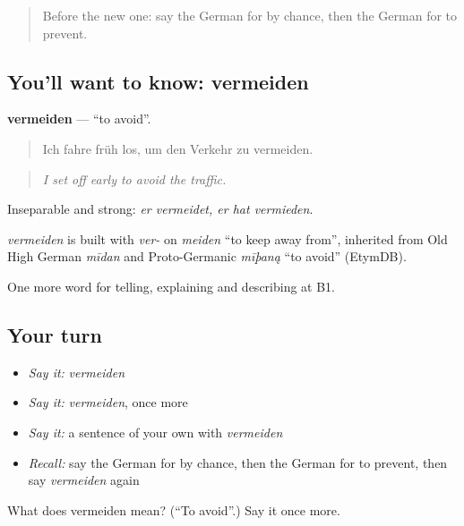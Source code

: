 \begin{quote}
Before the new one: say the German for by chance, then the German for to prevent.
\end{quote}

\subsection*{You'll want to know: vermeiden}
\textbf{vermeiden} — \textquotedblleft{}to avoid\textquotedblright{}.

\begin{quote}
Ich fahre früh los, um den Verkehr zu vermeiden.
\end{quote}

\begin{quote}
\emph{I set off early to avoid the traffic.}
\end{quote}

Inseparable and strong: \emph{er vermeidet, er hat vermieden}.

\begin{cousinweb}
\emph{vermeiden} is built with \emph{ver-} on \emph{meiden} \textquotedblleft{}to keep away from\textquotedblright{}, inherited from Old High German \emph{mīdan} and Proto-Germanic \emph{mīþaną} \textquotedblleft{}to avoid\textquotedblright{} (EtymDB).
\end{cousinweb}

\begin{grammarlens}[title={What you've built}]
One more word for telling, explaining and describing at B1.
\end{grammarlens}

\subsection*{Your turn}
\begin{itemize}
\raggedright
  \item \emph{Say it:} \emph{vermeiden}
  \item \emph{Say it:} \emph{vermeiden}, once more
  \item \emph{Say it:} a sentence of your own with \emph{vermeiden}
  \item \emph{Recall:} say the German for by chance, then the German for to prevent, then say \emph{vermeiden} again
\end{itemize}

\begin{tcolorbox}[breakable,colback=teal!4,colframe=teal!35!black,title={Before you move on}]
What does vermeiden mean? (\textquotedblleft{}To avoid\textquotedblright{}.) Say it once more.
\end{tcolorbox}
